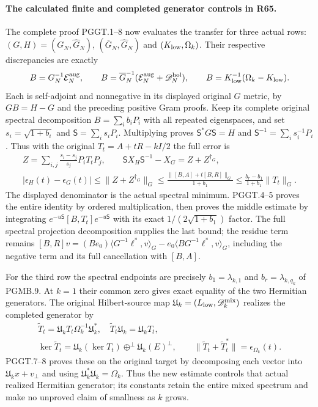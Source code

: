 \paragraph{The calculated finite and completed generator controls in R65.}
The complete proof PGGT.1--8 now evaluates the transfer for
three actual rows: $(G,H)=(G_N,\widehat G_N)$,
$(\overline G_N,\widehat G_N)$ and $(K_{\rm low},\Omega_k)$.
Their respective discrepancies are exactly
\[
 B=G_N^{-1}\mathcal E_N^{\rm aug},\qquad
 B=\overline G_N^{-1}
           (\mathcal E_N^{\rm aug}+\mathscr D_N^{\rm hol}),\qquad
 B=K_{\rm low}^{-1}(\Omega_k-K_{\rm low}).
\]
Each is self-adjoint and nonnegative in its displayed original
$G$ metric, by $GB=H-G$ and the preceding positive Gram
proofs. Keep its complete original spectral decomposition
$B=\sum_i b_iP_i$ with all repeated eigenspaces, and set
$s_i=\sqrt{1+b_i}$ and $\mathsf S=\sum_i s_iP_i$.
Multiplying proves $\mathsf S^*G\mathsf S=H$ and
$\mathsf S^{-1}=\sum_i s_i^{-1}P_i$. Thus with the original
$T_t=A+tR-kI/2$ the full error is
\[
 \begin{gathered}
 Z=\sum_{i,j}\frac{s_i-s_j}{s_j}P_iT_tP_j,\qquad
 \mathsf S X_H\mathsf S^{-1}-X_G=Z+Z^{\dagger_G},\\
 |\epsilon_H(t)-\epsilon_G(t)|
 \leq\|Z+Z^{\dagger_G}\|_G
 \leq\frac{\|[B,A]+t[B,R]\|_G}{1+b_1}
 \leq\frac{b_r-b_1}{1+b_1}\|T_t\|_G.
 \end{gathered}
\]
The displayed denominator is the actual spectral minimum.
PGGT.4--5 proves the entire identity by ordered multiplication,
then proves the middle estimate by integrating
$e^{-u\mathsf S}[B,T_t]e^{-u\mathsf S}$ with its exact
$1/(2\sqrt{1+b_1})$ factor. The full spectral projection
decomposition supplies the last bound; the residue term remains
$[B,R]v=(Be_0)\langle G^{-1}\ell^*,v\rangle_G
-e_0\langle BG^{-1}\ell^*,v\rangle_G$, including the
negative term and its full cancellation with $[B,A]$.

For the third row the spectral endpoints are precisely
$b_1=\lambda_{k,1}$ and $b_r=\lambda_{k,q_k}$ of PGMB.9.
At $k=1$ their common zero gives exact equality of the
two Hermitian generators. The original Hilbert-source map
$\mathfrak U_k=(L_{\rm low},\mathscr D_k^{\rm mix})$
realizes the completed generator by
\[
 \begin{gathered}
 \widetilde T_t=\mathfrak U_kT_t\Omega_k^{-1}\mathfrak U_k^*,
 \quad\widetilde T_t\mathfrak U_k=\mathfrak U_kT_t,\\
 \ker\widetilde T_t
 =\mathfrak U_k(\ker T_t)\mathbin{\oplus^\perp}
                                  \mathfrak U_k(E)^\perp,
 \qquad
 \|\widetilde T_t+\widetilde T_t^*\|
                           =\epsilon_{\Omega_k}(t).
 \end{gathered}
\]
PGGT.7--8 proves these on the original target by decomposing
each vector into $\mathfrak U_kx+v_\perp$ and using
$\mathfrak U_k^*\mathfrak U_k=\Omega_k$. Thus the new
estimate controls that actual realized Hermitian generator;
its constants retain the entire mixed spectrum and make no
unproved claim of smallness as $k$ grows.

